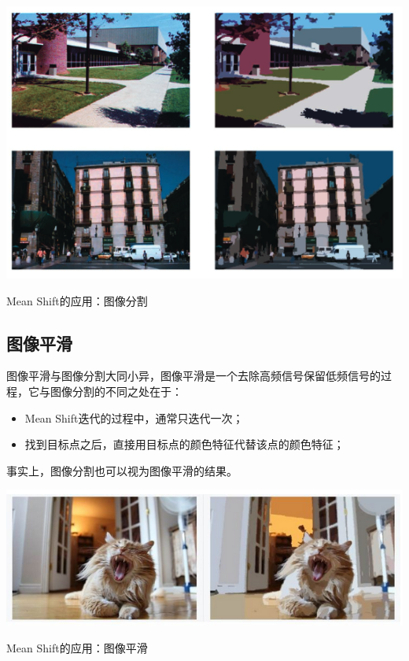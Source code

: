 \documentclass{article}
\begin{document}
\begin{center}
    \includegraphics[width=\textwidth]{Images/segmentation4.png}

    Mean Shift的应用：图像分割
\end{center}

\subsection{图像平滑}
图像平滑与图像分割大同小异，图像平滑是一个去除高频信号保留低频信号的过程，它与图像分割的不同之处在于：
\begin{itemize}
    \item Mean Shift迭代的过程中，通常只迭代一次；
    \item 找到目标点之后，直接用目标点的颜色特征代替该点的颜色特征；
\end{itemize}
事实上，图像分割也可以视为图像平滑的结果。
\begin{center}
    \includegraphics[width=\textwidth]{Images/smooth.png}

    Mean Shift的应用：图像平滑
\end{center}
\end{document}
